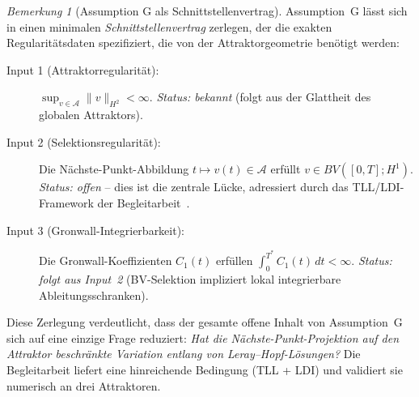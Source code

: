 \documentclass[12pt,a4paper]{article}
\theoremstyle{definition}
\theoremstyle{plain}
\theoremstyle{remark}
\newtheorem{remark}[definition]{Bemerkung}
\begin{document}
\begin{remark}[Assumption G als Schnittstellenvertrag]
\label{rem:g-interface-contract}
Assumption~G lässt sich in einen minimalen \emph{Schnittstellenvertrag} zerlegen, der die exakten Regularitätsdaten spezifiziert, die von der Attraktorgeometrie benötigt werden:
\begin{description}
\item[Input 1 (Attraktorregularität):] $\sup_{v \in \mathcal{A}} \|v\|_{H^2} < \infty$. \emph{Status: bekannt} (folgt aus der Glattheit des globalen Attraktors).
\item[Input 2 (Selektionsregularität):] Die Nächste-Punkt-Abbildung $t \mapsto v(t) \in \mathcal{A}$ erfüllt $v \in BV([0,T]; H^1)$. \emph{Status: offen} -- dies ist die zentrale Lücke, adressiert durch das TLL/LDI-Framework der Begleitarbeit~\cite{Geiger2026-LDI}.
\item[Input 3 (Gronwall-Integrierbarkeit):] Die Gronwall-Koeffizienten $C_1(t)$ erfüllen $\int_0^{T^*} C_1(t)\,dt < \infty$. \emph{Status: folgt aus Input~2} (BV-Selektion impliziert lokal integrierbare Ableitungsschranken).
\end{description}
Diese Zerlegung verdeutlicht, dass der gesamte offene Inhalt von Assumption~G sich auf eine einzige Frage reduziert: \emph{Hat die Nächste-Punkt-Projektion auf den Attraktor beschränkte Variation entlang von Leray--Hopf-Lösungen?} Die Begleitarbeit liefert eine hinreichende Bedingung (TLL + LDI) und validiert sie numerisch an drei Attraktoren.
\end{remark}
\end{document}
